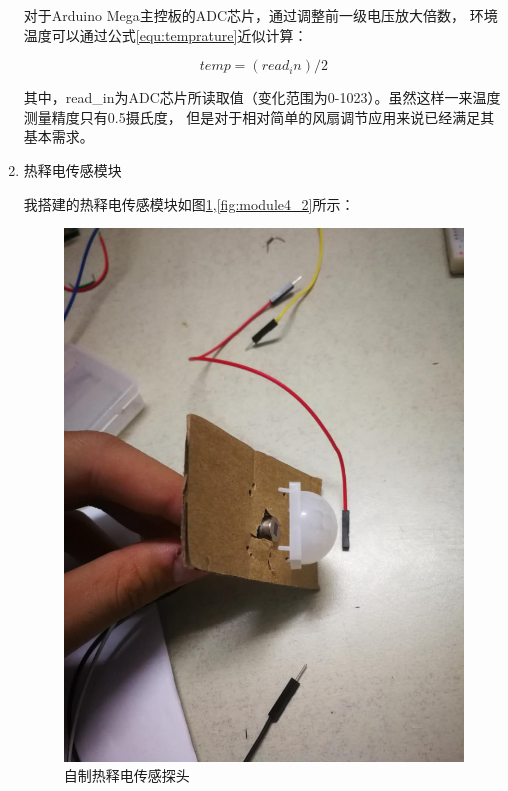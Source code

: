 \documentclass{article}
\begin{document}
\begin{spacing}{1.5}
\begin{enumerate}
    对于Arduino Mega主控板的ADC芯片，通过调整前一级电压放大倍数，
    环境温度可以通过公式\ref{equ:temprature}近似计算：

    \begin{equation}
        temp = (read_in) / 2 \label{equ:temprature} 
    \end{equation}

    其中，read\_in为ADC芯片所读取值（变化范围为0-1023）。虽然这样一来温度测量精度只有0.5摄氏度，
    但是对于相对简单的风扇调节应用来说已经满足其基本需求。

    \item 热释电传感模块

    我搭建的热释电传感模块如图\ref{fig:module4_1},\ref{fig:module4_2}所示：

    \begin{figure}[H]
        \centering
        \includegraphics[scale=0.1]{fig/result/module4_1.png}
        \caption{自制热释电传感探头}
        \label{fig:module4_1}
    \end{figure}
    

\end{enumerate}
\end{spacing}
\end{document}
